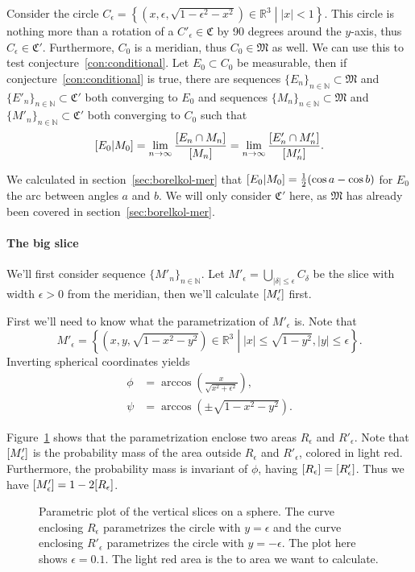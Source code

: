 \documentclass[twoside,a4paper]{article}
\theoremstyle{plain}
\theoremstyle{definition}
\theoremstyle{remark}
\numberwithin{equation}{section}
\newcommand{\N}{\mathbb{N}}
\newcommand{\R}{\mathbb{R}}
\let\P\relax
\DeclareMathOperator{\P}{\mathbb{P}}
\DeclareMathOperator{\1}{\mathbbm{1}}
\begin{document}
Consider the circle $C_\epsilon=\left\{\left(x,\epsilon,\sqrt{1-\epsilon^2-x^2}\right)\in\R^3\middle||x|<1\right\}$. This circle is nothing more than a rotation of a $C'_\epsilon\in\mathfrak{C}$ by 90 degrees around the $y$-axis, thus $C_\epsilon\in\mathfrak{C}'$. Furthermore, $C_0$ is a meridian, thus $C_0\in\mathfrak{M}$ as well. We can use this to test conjecture~\ref{con:conditional}. Let $E_0\subset C_0$ be measurable, then if conjecture~\ref{con:conditional} is true, there are sequences $\{E_n\}_{n\in\N}\subset\mathfrak{M}$ and $\{E'_n\}_{n\in\N}\subset\mathfrak{C}'$ both converging to $E_0$ and sequences $\{M_n\}_{n\in\N}\subset\mathfrak{M}$ and $\{M'_n\}_{n\in\N}\subset\mathfrak{C}'$ both converging to $C_0$ such that
\[\P[E_0|M_0]=\lim_{n\to\infty}\frac{\P[E_n\cap M_n]}{\P[M_n]}=\lim_{n\to\infty}\frac{\P[E'_n\cap M'_n]}{\P[M'_n]}.\]

We calculated in section~\ref{sec:borelkol-mer} that $\P[E_0|M_0]=\frac{1}{2}(\cos a-\cos b)$ for $E_0$ the arc between angles $a$ and $b$. We will only consider $\mathfrak{C}'$ here, as $\mathfrak{M}$ has already been covered in section~\ref{sec:borelkol-mer}.

\paragraph{The big slice}
We'll first consider sequence $\{M'_n\}_{n\in\N}$. Let $M'_\epsilon=\bigcup_{|\delta|\leq\epsilon}C_\delta$ be the slice with width $\epsilon>0$ from the meridian, then we'll calculate $\P[M'_\epsilon]$ first.

First we'll need to know what the parametrization of $M'_\epsilon$ is. Note that \[M'_\epsilon=\left\{\left(x,y,\sqrt{1-x^2-y^2}\right)\in\R^3\middle||x|\leq\sqrt{1-y^2},|y|\leq\epsilon\right\}.\]
Inverting spherical coordinates yields
\begin{align*}
\phi&=\arccos\left(\frac{x}{\sqrt{x^2+\epsilon^2}}\right),\\
\psi&=\arccos\left(\pm\sqrt{1-x^2-y^2}\right).
\end{align*}

Figure~\ref{fig:borelkol-coor} shows that the parametrization enclose two areas $R_\epsilon$ and $R'_\epsilon$. Note that $\P[M'_\epsilon]$ is the probability mass of the area outside $R_\epsilon$ and $R'_\epsilon$, colored in light red. Furthermore, the probability mass is invariant of $\phi$, having $\P[R_\epsilon]=\P[R'_\epsilon]$. Thus we have $\P[M'_\epsilon]=1-2\P[R_\epsilon]$.

\begin{figure}
\begin{center}

\end{center}
\caption{Parametric plot of the vertical slices on a sphere. The curve enclosing $R_\epsilon$ parametrizes the circle with $y=\epsilon$ and the curve enclosing $R'_\epsilon$ parametrizes the circle with $y=-\epsilon$. The plot here shows $\epsilon=0.1$. The light red area is the to area we want to calculate.}
\label{fig:borelkol-coor}
\end{figure}
\end{document}
